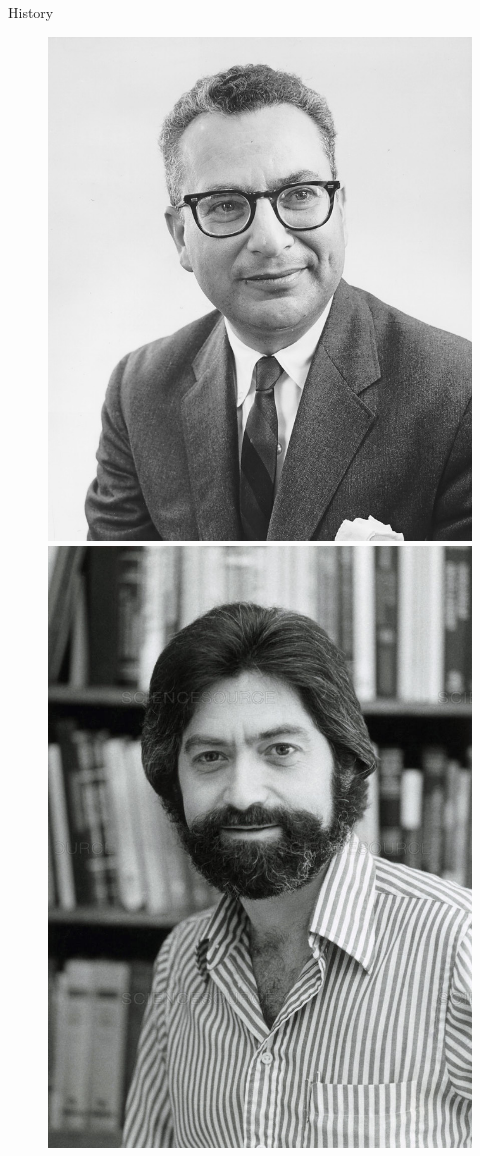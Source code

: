 \documentclass[10pt]{beamer}
\begin{document}
{\begin{frame}{History}
\begin{figure}
        \includegraphics[height=0.25\textheight]{figures/Gell-Mann.jpg}
        \includegraphics[height=0.25\textheight]{figures/Zweig.jpg}

\end{figure}
\end{frame}}
\end{document}
